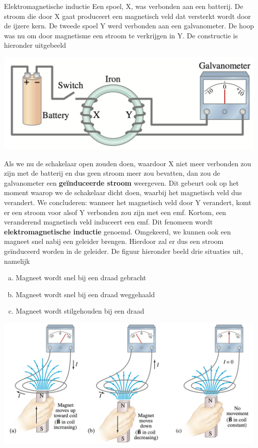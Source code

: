 \begin{theo}{Elektromagnetische inductie}
    Een spoel, X, was verbonden aan een batterij. De stroom die door X gaat produceert een magnetisch veld dat versterkt
    wordt door de ijzere kern. De tweede spoel Y werd verbonden aan een galvanometer. De hoop was nu om door magnetisme 
    een stroom te verkrijgen in Y. De constructie is hieronder uitgebeeld
    
    \begin{center}
        \includegraphics[scale = 0.35]{Images/Magnetisme/MagnetischeInductieExperiment.png}
    \end{center}

    \noindent Als we nu de schakelaar open zouden doen, waardoor X niet meer verbonden zou zijn met de batterij en dus geen stroom meer zou bevatten, 
    dan zou de galvanometer een \textbf{geïnduceerde stroom} weergeven. Dit gebeurt ook op het moment waarop we de schakelaar dicht doen, waarbij het
    magnetisch veld dus verandert. We concluderen: wanneer het magnetisch veld door Y verandert, komt er een stroom voor alsof Y verbonden zou 
    zijn met een emf. Kortom, een veranderend magnetisch veld induceert een emf. Dit fenomeen wordt \textbf{elektromagnetische inductie} genoemd. 
    Omgekeerd, we kunnen ook een magneet snel nabij een geleider brengen. Hierdoor zal er dus een stroom geïnduceerd worden in de geleider.
    De figuur hieronder beeld drie situaties uit, namelijk
    \begin{enumerate}[(a)]
        \item Magneet wordt snel bij een draad gebracht
        \item Magneet wordt snel bij een draad weggehaald
        \item Magneet wordt stilgehouden bij een draad
    \end{enumerate}

    \begin{center}
        \includegraphics[scale = 0.35]{Images/Magnetisme/MagnetischeInductieMagneet.png}
    \end{center}
\end{theo}

